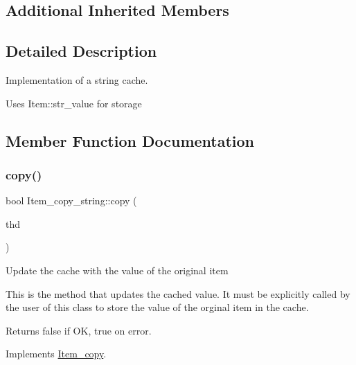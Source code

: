 \subsection*{Additional Inherited Members}


\subsection{Detailed Description}
Implementation of a string cache.

Uses Item\+::str\+\_\+value for storage 

\subsection{Member Function Documentation}
\mbox{\label{classItem__copy__string_a35d49a3dc996343f458a63d62e7bf776}} 
\subsubsection{\texorpdfstring{copy()}{copy()}}
{\footnotesize\ttfamily bool Item\+\_\+copy\+\_\+string\+::copy (\begin{DoxyParamCaption}\item[{const T\+HD $\ast$}]{thd }\end{DoxyParamCaption})\hspace{0.3cm}{\ttfamily [virtual]}}

Update the cache with the value of the original item

This is the method that updates the cached value. It must be explicitly called by the user of this class to store the value of the orginal item in the cache. \begin{DoxyReturn}{Returns}
false if OK, true on error. 
\end{DoxyReturn}


Implements \mbox{\hyperlink{classItem__copy_a575caec22eeb27fb76d5aa74b1a8d492}{Item\+\_\+copy}}.

\mbox{\label{classItem__copy__string_ab2594565cca52438e556cbce30e199e6}} 
